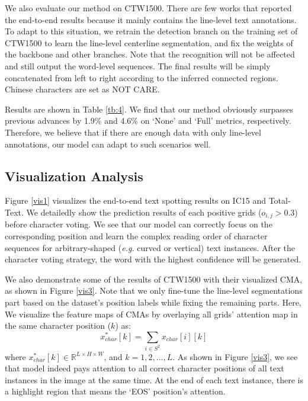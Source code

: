 \documentclass[letterpaper]{article} \usepackage{aaai21}  \usepackage{times}  \usepackage{helvet} \usepackage{courier}  \usepackage[hyphens]{url}  \usepackage{graphicx} \urlstyle{rm} \def\UrlFont{\rm}  \usepackage{natbib}  \usepackage{caption} \frenchspacing  \setlength{\pdfpagewidth}{8.5in}  \setlength{\pdfpageheight}{11in}  \usepackage{multirow}
\begin{document}
We also evaluate our method on CTW1500. There are few works that reported the end-to-end results because it mainly contains the line-level text annotations.
To adapt to this situation, we retrain the detection branch on the training set of CTW1500 to learn the line-level centerline segmentation, and fix the weights of the backbone and other branches. Note that the recognition will not be affected and still output the word-level sequences. The final results will be simply concatenated from left to right according to the inferred connected regions. Chinese characters are set as NOT CARE.

Results are shown in Table \ref{tb:4}. We find that our method obviously surpasses previous advances by 1.9\% and 4.6\% on `None' and `Full' metrics, respectively.
Therefore, we believe that if there are enough data with only line-level annotations, our model can adapt to such scenarios well.

\subsection{Visualization Analysis}
Figure \ref{vis1} visualizes the end-to-end text spotting results on IC15 and Total-Text.
We detailedly show the prediction results of each positive grids ($o_{i,j}$$>$$0.3$) before character voting.
We see that our model can correctly focus on the corresponding position and learn the complex reading order of character sequences for arbitrary-shaped (\emph{e.g.} curved or vertical) text instances.
After the character voting strategy, the word with the highest confidence will be generated.



We also demonstrate some of the results of CTW1500 with their visualized CMA, as shown in Figure \ref{vis3}.
Note that we only fine-tune the line-level segmentations part based on the dataset's position labels while fixing the remaining parts.
Here, We visualize the feature maps of CMAs by overlaying all grids' attention map in the same character position ($k$) as:
\begin{equation}
x^{*}_{char}[k]=\sum_{i \in S^2} x_{char}[i][k]
\end{equation}
where $x^{*}_{char}[k]\in \mathbb{R}^{L\times H \times W}$, and $k=1,2,...,L$.
As shown in Figure \ref{vis3}, we see that model indeed pays attention to all correct character positions of all text instances in the image at the same time.  At the end of each text instance, there is a highlight region that means the `EOS' position's attention.
\end{document}
